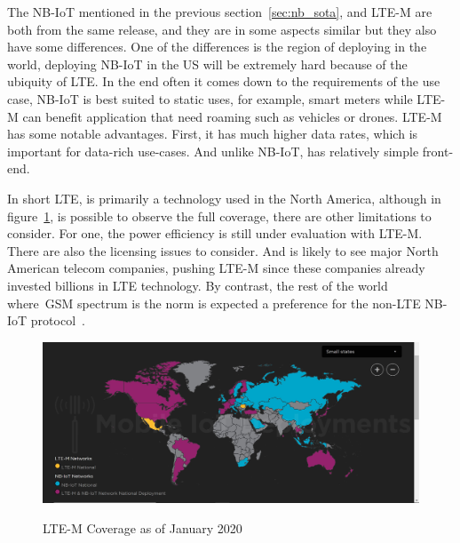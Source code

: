 The NB-IoT mentioned in the previous section~\ref{sec:nb_sota}, and LTE-M are both from the same release, and they are in some aspects similar but they also have some differences. One of the differences is the region of deploying in the world, deploying NB-IoT in the US will be extremely hard because of the ubiquity of LTE. 
In the end often it comes down to the requirements of the use case, NB-IoT is best suited to static uses,  for example,  smart meters while LTE-M can benefit application that need  roaming  such as vehicles or drones. LTE-M has some notable advantages. First, it has much higher data rates, which is important for data-rich use-cases. And unlike NB-IoT, has relatively simple front-end.


In short LTE, is primarily a technology used in the North America, although in figure~\ref{fig:LTE-M}, is possible to observe the full coverage, there are other limitations to consider. For one, the power efficiency is still under evaluation with LTE-M. There are also the licensing issues to consider.
And is likely to see major North American telecom companies, pushing LTE-M since these companies already invested billions in LTE technology. By contrast,  the rest of the world where~\gls{GSM} spectrum is the norm is expected  a preference for the non-LTE NB-IoT protocol~\cite{Hwang2018}.


\begin{figure}[htbp]

  \centering
  
    {\includegraphics[height=2 in,width=0.75\linewidth]{Chapters/Figures/LTE-coverage.JPG}}%
 
  \caption{LTE-M Coverage as of January 2020~\cite{IoTCoverage}}
  \label{fig:LTE-M}
  
\end{figure}

